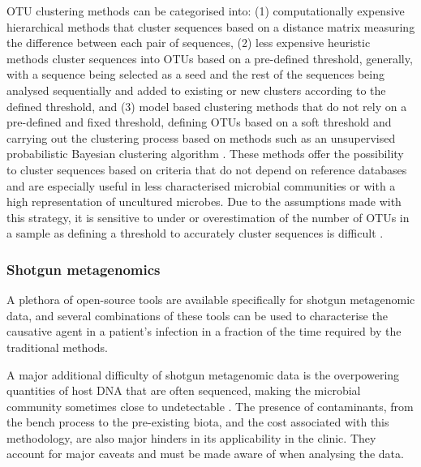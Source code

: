 OTU clustering methods can be categorised into: (1) computationally expensive hierarchical methods that cluster sequences based on a distance matrix measuring the difference between each pair of sequences, (2) less expensive heuristic methods cluster sequences into OTUs based on a pre-defined threshold, generally, with a sequence being selected as a seed and the rest of the sequences being analysed sequentially and added to existing or new clusters according to the defined threshold, and (3) model based clustering methods that do not rely on a pre-defined and fixed threshold, defining OTUs based on a soft threshold and carrying out the clustering process based on methods such as an unsupervised probabilistic Bayesian clustering algorithm \citep{hao_clustering_2011}. These methods offer the possibility to cluster sequences based on criteria that do not depend on reference databases and are especially useful in less characterised microbial communities or with a high representation of uncultured microbes. Due to the assumptions made with this strategy, it is sensitive to under or overestimation of the number of OTUs in a sample as defining a threshold to accurately cluster sequences is difficult \citep{westcott_novo_2015}.

\subsubsection{Shotgun metagenomics} \label{ssec:shotgun_metagenomics_bioinfo}

A plethora of open-source tools are available specifically for shotgun metagenomic data, and several combinations of these tools can be used to characterise the causative agent in a patient's infection in a fraction of the time required by the traditional methods. 

A major additional difficulty of shotgun metagenomic data is the overpowering quantities of host DNA that are often sequenced, making the microbial community sometimes close to undetectable \citep{couto_critical_2018}.
The presence of contaminants, from the bench process to the pre-existing biota, and the cost associated with this methodology, are also major hinders in its applicability in the clinic.
They account for major caveats and must be made aware of when analysing the data.


